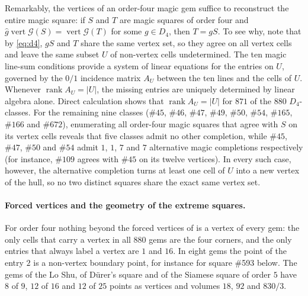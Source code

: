 \begin{remark}
\label{rem:vertexset}
Remarkably, the vertices of an order-four magic gem suffice to reconstruct the entire magic square: if $S$ and $T$ are magic squares of order four and $\hat g\operatorname{vert}\mathcal G(S)=\operatorname{vert}\mathcal G(T)$ for some $g\in D_4$, then $T=gS$.
To see why, note that by \eqref{eq:d4}, $gS$ and $T$ share the same vertex set, so they agree on all vertex cells and leave the same subset $U$ of non-vertex cells undetermined.
The ten magic line-sum conditions provide a system of linear equations for the entries on $U$, governed by the $0/1$ incidence matrix $A_U$ between the ten lines and the cells of $U$. Whenever $\operatorname{rank}A_U=|U|$, the missing entries are uniquely determined by linear algebra alone.
Direct calculation shows that $\operatorname{rank}A_U=|U|$ for $871$ of the $880$ $D_4$-classes.
For the remaining nine classes ($\#45$, $\#46$, $\#47$, $\#49$, $\#50$, $\#54$, $\#165$, $\#166$ and $\#672$), enumerating all order-four magic squares that agree with $S$ on its vertex cells reveals that five classes admit no other completion, while $\#45$, $\#47$, $\#50$ and $\#54$ admit $1$, $1$, $7$ and $7$ alternative magic completions respectively (for instance, $\#109$ agrees with $\#45$ on its twelve vertices). In every such case, however, the alternative completion turns at least one cell of $U$ into a new vertex of the hull, so no two distinct squares share the exact same vertex set.
\end{remark}

\paragraph{Forced vertices and the geometry of the extreme squares.}
For order four nothing beyond the forced vertices of  is a vertex of every gem: the only cells that carry a vertex in all $880$ gems are the four corners, and the only entries that always label a vertex are $1$ and $16$.
In eight gems the point of the entry $2$ is a non-vertex boundary point, for instance for square \#593 below.
The gems of the Lo Shu, of D\"urer's square and of the Siamese square of order $5$ have $8$ of $9$, $12$ of $16$ and $12$ of $25$ points as vertices and volumes $18$, $92$ and $830/3$.

